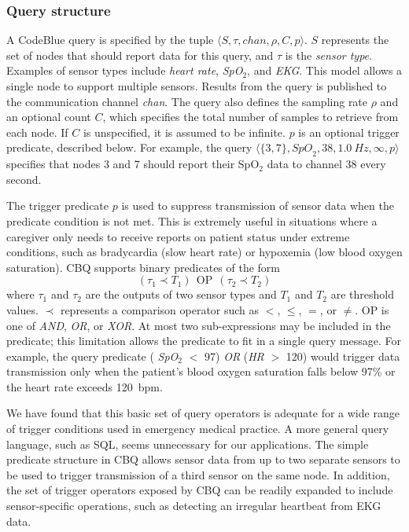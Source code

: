 \subsubsection{Query structure}

A CodeBlue query is specified by the tuple $\langle
S,\tau,\mathit{chan},\rho,C,p \rangle$.  $S$ represents the set of
nodes that should report data for this query, and $\tau$ is the {\em
sensor type}.  Examples of sensor types include {\em heart rate}, {\em
SpO$_2$}, and {\em EKG}. This model allows a single node to support
multiple sensors. Results from the query is published to the
communication channel {\em chan}.  The query also defines the
sampling rate $\rho$ and an optional count $C$, which specifies the
total number of samples to retrieve from each node. If $C$ is
unspecified, it is assumed to be infinite.  $p$ is an optional
trigger predicate, described below. For example, the query $\langle
\{3,7\}, \mathit{SpO}_2, 38, 1.0~\mathit{Hz}, \infty, p \rangle$
specifies that nodes 3 and 7 should report their SpO$_2$ data to
channel 38 every second.

The trigger predicate $p$ is used to suppress transmission of sensor
data when the predicate condition is not met. This is extremely useful
in situations where a caregiver only needs to receive reports on
patient status under extreme conditions, such as bradycardia (slow
heart rate) or hypoxemia (low blood oxygen saturation). CBQ supports
binary predicates of the form
\[
(\tau_1 \prec T_1) \ \ \mathrm{OP} \ \ (\tau_2 \prec T_2)
\]
where $\tau_1$ and $\tau_2$ are the outputs of two sensor types and
$T_1$ and $T_2$ are threshold values. $\prec$ represents a comparison
operator such as $<$, $\leq$, $=$, or $\neq$. OP is one of {\em AND},
{\em OR}, or {\em XOR}. At most two sub-expressions may
be included in the predicate; this limitation allows the predicate to
fit in a single query message.  For example, the query predicate ({\em
SpO$_2$} $<$ 97) {\em OR} ({\em HR} $>$ 120) would trigger data
transmission only when the patient's blood oxygen saturation falls
below 97\% or the heart rate exceeds 120~bpm.

We have found that this basic set of query operators is adequate for a
wide range of trigger conditions used in emergency medical practice.
A more general query language, such as SQL, seems unnecessary for our
applications. The simple predicate structure in CBQ allows sensor data
from up to two separate sensors to be used to trigger transmission of
a third sensor on the same node.  In addition, the set of trigger
operators exposed by CBQ can be readily expanded to include
sensor-specific operations, such as detecting an irregular heartbeat
from EKG data. 


